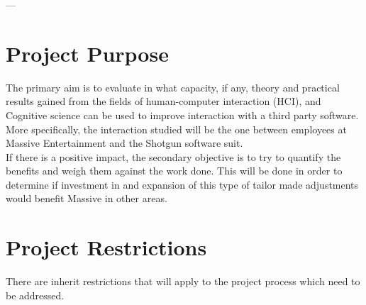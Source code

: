 \documentclass[10pt]{article}
\begin{document}
\tableofcontents

\begin{center}
---
\end{center}

\section{Project Purpose}

  The primary aim is to evaluate in what capacity, if any, theory and practical
  results gained from the fields of human-computer interaction\cite{c_hci}
  (HCI), and Cognitive science\cite{c_congnitivescience} can be used to improve
  interaction with a third party software. More specifically, the interaction
  studied will be the one between employees at Massive
  Entertainment\cite{c_massive} and the Shotgun\cite{c_shotgun} software suit.
  \\

  If there is a positive impact, the secondary objective is to try to
  quantify the benefits and weigh them against the work done. This will be done
  in order to determine if investment in and expansion of this type of tailor
  made adjustments would benefit Massive in other areas.




\section{Project Restrictions}


  There are inherit restrictions that will apply to the project process which
  need to be addressed.
\end{document}
